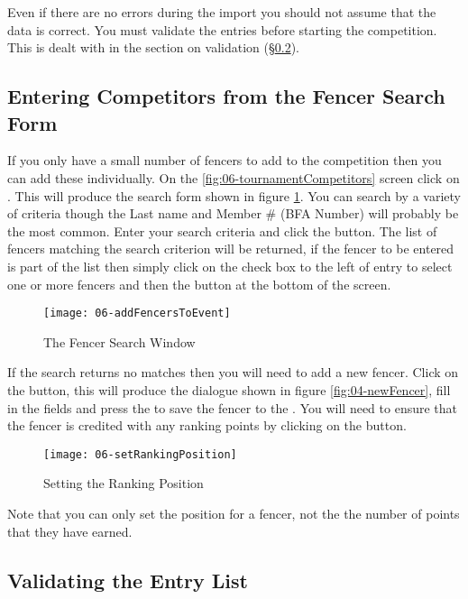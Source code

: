 \documentclass[a4paper,11pt]{memoir}
\begin{document}
Even if there are no errors during the import you should not assume that the data is correct. You must validate the entries before starting the competition. This is dealt with in the section on validation (\S\ref{sec:validation}).

\subsection{Entering Competitors from the Fencer Search Form}
If you only have a small number of fencers to add to the competition then you can add these individually. On the \ref{fig:06-tournamentCompetitors} screen click on . This will produce the search form shown in figure \ref{fig:06-addFencersToEvent}. You can search by a variety of criteria though the Last name and Member \# (BFA Number) will probably be the most common. Enter your search criteria and click the  button. The list of fencers matching the search criterion will be returned, if the fencer to be entered is part of the list then simply click on the check box to the left of entry to select one or more fencers and then the  button at the bottom of the screen.

\begin{figure}[!ht]
 \centering
 \texttt{[image: 06-addFencersToEvent]}
 \caption{The Fencer Search Window} \label{fig:06-addFencersToEvent}
\end{figure}

If the search returns no matches then you will need to add a new fencer. Click on the  button, this will produce the dialogue shown in figure \ref{fig:04-newFencer}, fill in the fields and press the  to save the fencer to the . You will need to ensure that the fencer is credited with any ranking points by clicking on the  button.

\begin{figure}[!ht]
 \centering
 \texttt{[image: 06-setRankingPosition]}
 \caption{Setting the Ranking Position} \label{fig:06-setRankingPosition}
\end{figure}

Note that you can only set the  position for a fencer, not the the number of points that they have earned.

\subsection{Validating the Entry List}\label{sec:validation}
\end{document}
